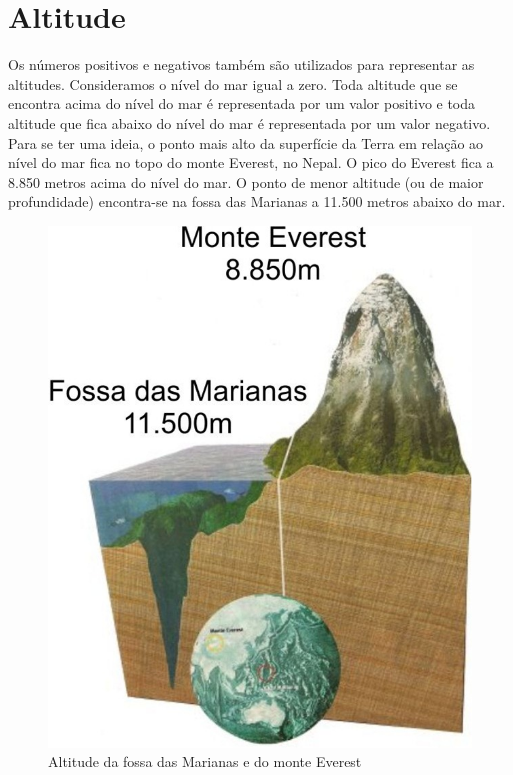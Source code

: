 \documentclass{article}
\begin{document}
\section{Altitude}
Os números positivos e negativos também são utilizados para representar as altitudes. Consideramos o nível do mar igual a zero. Toda altitude que se encontra acima do nível do mar é representada por um valor positivo e toda altitude que fica abaixo do nível do mar é representada por um valor negativo. 
Para se ter uma ideia, o ponto mais alto da superfície da Terra em relação ao nível do mar fica no topo do monte Everest, no Nepal. O pico do Everest fica a 8.850 metros acima do nível do mar. O ponto de menor altitude (ou de maior profundidade) encontra-se na fossa das Marianas a 11.500 metros abaixo do mar. 
\begin{figure}[htb]
    \centering
    \includegraphics[scale =0.5]{fossa-das-marianas-2.jpg}
    \caption{Altitude da fossa das Marianas e do monte Everest}
    \label{fig:my_label}
\end{figure}
\end{document}
